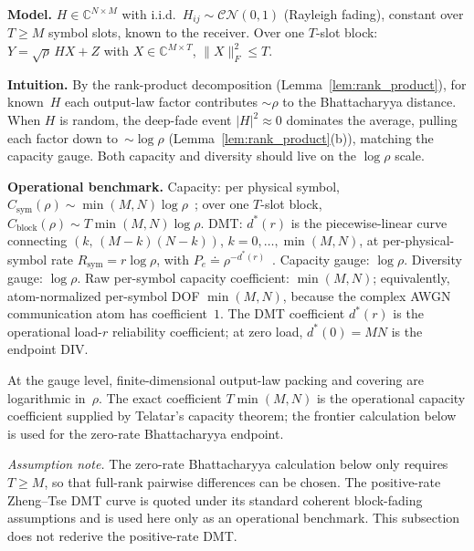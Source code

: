 \documentclass[lettersize,onecolumn]{IEEEtran}
\newcommand{\C}{\mathbb{C}}
\newcommand{\snr}{\rho}
\begin{document}
\textbf{Model.}
$H \in \C^{N\times M}$ with i.i.d.\
$H_{ij} \sim \mathcal{CN}(0,1)$ (Rayleigh fading), constant over
$T \ge M$ symbol slots, known to the receiver. Over one $T$-slot block:
$Y = \sqrt{\snr}\,HX + Z$ with $X \in \C^{M\times T}$,
$\|X\|_F^2 \le T$.

\textbf{Intuition.}
By the rank-product decomposition (Lemma~\ref{lem:rank_product}), for known~$H$
each output-law factor contributes $\sim\snr$ to the Bhattacharyya
distance. When $H$ is random, the deep-fade event $|H|^2\approx 0$
dominates the average, pulling each factor down to~$\sim\log\snr$
(Lemma~\ref{lem:rank_product}(b)), matching the capacity gauge.
Both capacity and diversity should live on the $\log\snr$ scale.

\textbf{Operational benchmark.}
Capacity: per physical symbol,
$C_{\mathrm{sym}}(\snr) \sim \min(M,N)\log\snr$~\cite{Telatar1999};
over one $T$-slot block,
$C_{\mathrm{block}}(\snr) \sim T\min(M,N)\log\snr$.
DMT: $d^*(r)$ is the piecewise-linear curve connecting
$(k,\,(M-k)(N-k))$, $k=0,\dots,\min(M,N)$, at per-physical-symbol rate $R_{\mathrm{sym}} = r\log\snr$,
with $P_e \doteq \snr^{-d^*(r)}$~\cite{ZhengTse2003}. Capacity
gauge: $\log\snr$. Diversity gauge: $\log\snr$. Raw per-symbol
capacity coefficient: $\min(M,N)$; equivalently, atom-normalized
per-symbol DOF $\min(M,N)$, because the complex AWGN communication
atom has coefficient~$1$. The DMT coefficient $d^*(r)$ is the
operational load-$r$ reliability coefficient; at zero load,
$d^*(0)=MN$ is the endpoint DIV.

At the gauge level, finite-dimensional output-law packing and
covering are logarithmic in~$\snr$. The exact coefficient
$T\min(M,N)$ is the operational capacity coefficient supplied by
Telatar's capacity theorem; the frontier calculation below is used
for the zero-rate Bhattacharyya endpoint.

\emph{Assumption note.} The zero-rate Bhattacharyya calculation
below only requires $T\ge M$, so that full-rank pairwise differences
can be chosen. The positive-rate Zheng--Tse DMT curve is quoted under
its standard coherent block-fading assumptions and is used here only
as an operational benchmark. This subsection does not rederive the
positive-rate DMT.
\end{document}
